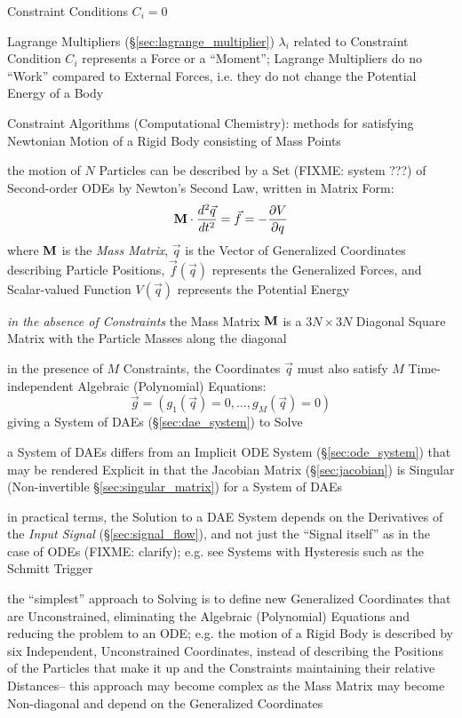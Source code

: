 Constraint Conditions $C_i = 0$

Lagrange Multipliers (\S\ref{sec:lagrange_multiplier}) $\lambda_i$ related to
Constraint Condition $C_i$ represents a Force or a ``Moment''; Lagrange
Multipliers do no ``Work'' compared to External Forces, i.e. they do not change
the Potential Energy of a Body

Constraint Algorithms (Computational Chemistry): methods for satisfying
Newtonian Motion of a Rigid Body consisting of Mass Points

the motion of $N$ Particles can be described by a Set (FIXME: system ???) of
Second-order ODEs by Newton's Second Law, written in Matrix Form:
\[
  \mathbf{M} \cdot \frac{d^2\vec{q}}{dt^2}
    = \vec{f} = -\frac{\partial{V}}{\partial{q}}
\]
where $\mathbf{M}$ is the \emph{Mass Matrix}, $\vec{q}$ is the Vector of
Generalized Coordinates describing Particle Positions, $\vec{f}(\vec{q})$
represents the Generalized Forces, and Scalar-valued Function $V(\vec{q})$
represents the Potential Energy

\emph{in the absence of Constraints} the Mass Matrix $\mathbf{M}$ is a $3N \times
3N$ Diagonal Square Matrix with the Particle Masses along the diagonal

in the presence of $M$ Constraints, the Coordinates $\vec{q}$ must also satisfy
$M$ Time-independent Algebraic (Polynomial) Equations:
\[
  \vec{g} = (g_1(\vec{q}) = 0, \ldots, g_M(\vec{q}) = 0)
\]
giving a System of DAEs (\S\ref{sec:dae_system}) to Solve

\fist a System of DAEs differs from an Implicit ODE System
(\S\ref{sec:ode_system}) that may be rendered Explicit in that the Jacobian
Matrix (\S\ref{sec:jacobian}) is Singular (Non-invertible
\S\ref{sec:singular_matrix}) for a System of DAEs

in practical terms, the Solution to a DAE System depends on the Derivatives of
the \emph{Input Signal} (\S\ref{sec:signal_flow}), and not just the ``Signal
itself'' as in the case of ODEs (FIXME: clarify); e.g. see Systems with
Hysteresis such as the Schmitt Trigger

the ``simplest'' approach to Solving is to define new Generalized Coordinates
that are Unconstrained, eliminating the Algebraic (Polynomial) Equations and
reducing the problem to an ODE; e.g. the motion of a Rigid Body is described by
six Independent, Unconstrained Coordinates, instead of describing the Positions
of the Particles that make it up and the Constraints maintaining their relative
Distances-- this approach may become complex as the Mass Matrix may become
Non-diagonal and depend on the Generalized Coordinates

